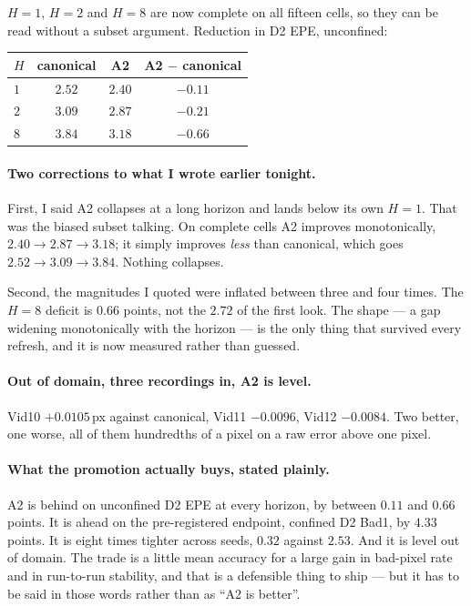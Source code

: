 \documentclass[11pt,a4paper]{article}
\begin{document}
$H{=}1$, $H{=}2$ and $H{=}8$ are now complete on all fifteen cells, so they can
be read without a subset argument. Reduction in D2 EPE, unconfined:

\begin{center}
\begin{tabular}{lccc}
\toprule
$H$ & canonical & A2 & A2 $-$ canonical \\
\midrule
$1$ & $2.52$ & $2.40$ & $-0.11$ \\
$2$ & $3.09$ & $2.87$ & $-0.21$ \\
$8$ & $3.84$ & $3.18$ & $-0.66$ \\
\bottomrule
\end{tabular}
\end{center}

\paragraph{Two corrections to what I wrote earlier tonight.}
First, I said A2 collapses at a long horizon and lands below its own $H{=}1$.
That was the biased subset talking. On complete cells A2 improves monotonically,
$2.40 \rightarrow 2.87 \rightarrow 3.18$; it simply improves \emph{less} than
canonical, which goes $2.52 \rightarrow 3.09 \rightarrow 3.84$. Nothing collapses.

Second, the magnitudes I quoted were inflated between three and four times. The
$H{=}8$ deficit is $0.66$ points, not the $2.72$ of the first look. The shape
--- a gap widening monotonically with the horizon --- is the only thing that
survived every refresh, and it is now measured rather than guessed.

\paragraph{Out of domain, three recordings in, A2 is level.} Vid10 $+0.0105$\,px
against canonical, Vid11 $-0.0096$, Vid12 $-0.0084$. Two better, one worse, all
of them hundredths of a pixel on a raw error above one pixel.

\paragraph{What the promotion actually buys, stated plainly.} A2 is behind on
unconfined D2 EPE at every horizon, by between $0.11$ and $0.66$ points. It is
ahead on the pre-registered endpoint, confined D2 Bad1, by $4.33$ points. It is
eight times tighter across seeds, $0.32$ against $2.53$. And it is level out of
domain. The trade is a little mean accuracy for a large gain in bad-pixel rate
and in run-to-run stability, and that is a defensible thing to ship --- but it
has to be said in those words rather than as ``A2 is better''.
\end{document}
